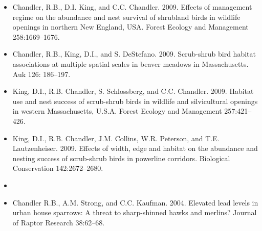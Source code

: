\documentclass[12pt]{article}
\begin{document}
\begin{itemize}
\item Chandler, R.B., D.I. King, and C.C. Chandler. 2009. Effects
  of management regime on the abundance and nest survival of shrubland
  birds in wildlife openings in northern New England, USA. Forest
  Ecology and Management 258:1669--1676.

\item Chandler, R.B., King, D.I., and
  S. DeStefano. 2009. Scrub-shrub bird habitat associations at
  multiple spatial scales in beaver meadows in Massachusetts. Auk 126:
  186--197.

\item King, D.I., R.B. Chandler, S. Schlossberg, and
  C.C. Chandler. 2009. Habitat use and nest success of scrub-shrub
  birds in wildlife and silvicultural openings in western
  Massachusetts, U.S.A. Forest Ecology and Management 257:421--426.

\item King, D.I., R.B. Chandler, J.M. Collins, W.R. Peterson, and
  T.E. Lautzenheiser. 2009. Effects of width, edge and habitat on the
  abundance and nesting success of scrub-shrub birds in powerline
  corridors. Biological Conservation 142:2672--2680.

\item[] { \\}

\item Chandler R.B., A.M. Strong, and C.C. Kaufman. 2004. Elevated
  lead levels in urban house sparrows: A threat to sharp-shinned hawks
  and merlins? Journal of Raptor Research 38:62--68.

\end{itemize}









\end{document}
